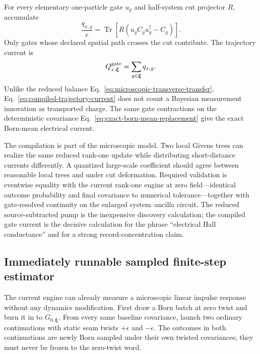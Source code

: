 \documentclass[aps,prb,onecolumn,nofootinbib,superscriptaddress]{revtex4-2}
\newcommand{\Tr}{\operatorname{Tr}}
\newcommand{\bxi}{\bm{\xi}}
\begin{document}
For every elementary one-particle gate $u_g$ and half-system cut projector
$R$, accumulate
\begin{equation}
  \frac{q_{x,g}}{e}
  =\Tr\!\left[
    R\left(u_gC_gu_g^\dagger-C_g\right)
  \right].
  \label{eq:gate-resolved-current}
\end{equation}
Only gates whose declared spatial path crosses the cut contribute.  The
trajectory current is
\begin{equation}
  Q^{\rm gate}_{x,\bxi}=\sum_{g\in\bxi}q_{x,g}.
  \label{eq:compiled-trajectory-current}
\end{equation}
Unlike the reduced balance Eq.~\eqref{eq:microscopic-transverse-transfer},
Eq.~\eqref{eq:compiled-trajectory-current} does not count a Bayesian
measurement innovation as transported charge.  The same gate contractions on
the deterministic covariance Eq.~\eqref{eq:exact-born-mean-replacement} give
the exact Born-mean electrical current.

The compilation is part of the microscopic model.  Two local Givens trees can
realize the same reduced rank-one update while distributing short-distance
currents differently.  A quantized large-scale coefficient should agree
between reasonable local trees and under cut deformation.  Required
validation is eventwise equality with the current rank-one engine at zero
field---identical outcome probability and final covariance to numerical
tolerance---together with gate-resolved continuity on the enlarged
system--ancilla circuit.  The reduced source-subtracted pump is the inexpensive
discovery calculation; the compiled gate current is the decisive calculation
for the phrase ``electrical Hall conductance'' and for a strong
record-concentration claim.

\subsection{Immediately runnable sampled finite-step estimator}

The current engine can already measure a microscopic linear impulse response
without any dynamics modification.  First draw a Born batch at zero twist and
burn it in to $G_{0,\bxi}$.  From every same baseline covariance, launch two
ordinary continuations with static seam twists $+\epsilon$ and $-\epsilon$.
The outcomes in both continuations are newly Born sampled under their own
twisted covariances; they must never be frozen to the zero-twist word.
\end{document}
